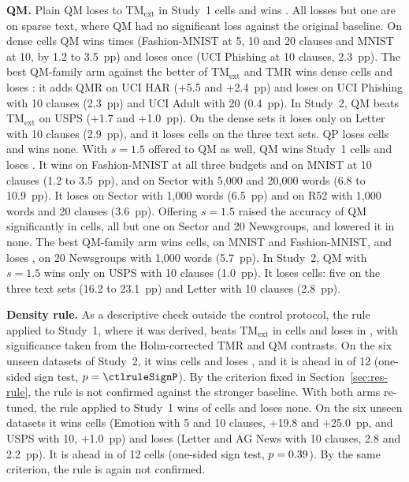 \documentclass[preprint,12pt,times]{elsarticle}
\newcommand{\add}[1]{{\color{blue}#1}}
\begin{document}
\textbf{QM.} Plain QM loses to TM$_{\mathrm{ext}}$ in \ctlQextallL{} Study~1 cells and wins \ctlQextallW{}.
All losses but one are on sparse text, where QM had no significant loss against the original baseline.
On dense cells QM wins \ctlQextdenseW{} times (Fashion-MNIST at 5, 10 and 20 clauses and MNIST at 10, by 1.2 to 3.5~pp) and loses once (UCI Phishing at 10 clauses, 2.3~pp).
The best QM-family arm against the better of TM$_{\mathrm{ext}}$ and TMR wins \ctlBextdenseW{} dense cells and loses \ctlBextdenseL{}: it adds QMR on UCI HAR (+5.5 and +2.4~pp) and loses on UCI Phishing with 10 clauses (2.3~pp) and UCI Adult with 20 (0.4~pp).
In Study~2, QM beats TM$_{\mathrm{ext}}$ on USPS (+1.7 and +1.0~pp). On the dense sets it loses only on Letter with 10 clauses (2.9~pp), and it loses \ctlSQextsparseL{} cells on the three text sets.
QP loses \ctlPextallL{} cells and wins none.
\add{With $s = 1.5$ offered to QM as well, QM wins \ctlQbothallW{} Study~1 cells and loses \ctlQbothallL{}.
It wins on Fashion-MNIST at all three budgets and on MNIST at 10 clauses (1.2 to 3.5~pp), and on Sector with 5,000 and 20,000 words (6.8 to 10.9~pp).
It loses on Sector with 1,000 words (6.5~pp) and on R52 with 1,000 words and 20 clauses (3.6~pp).
Offering $s = 1.5$ raised the accuracy of QM significantly in \ctlQselfSW{} cells, all but one on Sector and 20 Newsgroups, and lowered it in none.
The best QM-family arm wins \ctlBbothallW{} cells, on MNIST and Fashion-MNIST, and loses \ctlBbothallL{}, on 20 Newsgroups with 1,000 words (5.7~pp).
In Study~2, QM with $s = 1.5$ wins only on USPS with 10 clauses (1.0~pp). It loses \ctlSQbothallL{} cells: five on the three text sets (16.2 to 23.1~pp) and Letter with 10 clauses (2.8~pp).}

\textbf{Density rule.} As a descriptive check outside the control protocol, the rule applied to Study~1, where it was derived, beats TM$_{\mathrm{ext}}$ in \ctlSoneRuleW{} cells and loses in \ctlSoneRuleL{}, with significance taken from the Holm-corrected TMR and QM contrasts.
On the six unseen datasets of Study~2, it wins \ctlruleextallW{} cells and loses \ctlruleextallL{}, and it is ahead in \ctlrulePos{} of 12 (one-sided sign test, $p = \ctlruleSignP$).
By the criterion fixed in Section~\ref{sec:res-rule}, the rule is not confirmed against the stronger baseline.
\add{With both arms re-tuned, the rule applied to Study~1 wins \ctlSoneRuleBothW{} of \ctlSoneRuleBothN{} cells and loses none.
On the six unseen datasets it wins \ctlrulebothallW{} cells (Emotion with 5 and 10 clauses, +19.8 and +25.0~pp, and USPS with 10, +1.0~pp) and loses \ctlrulebothallL{} (Letter and AG News with 10 clauses, 2.8 and 2.2~pp).
It is ahead in \ctlruleBothPos{} of 12 cells (one-sided sign test, $p = 0.39$).
By the same criterion, the rule is again not confirmed.}
\end{document}
